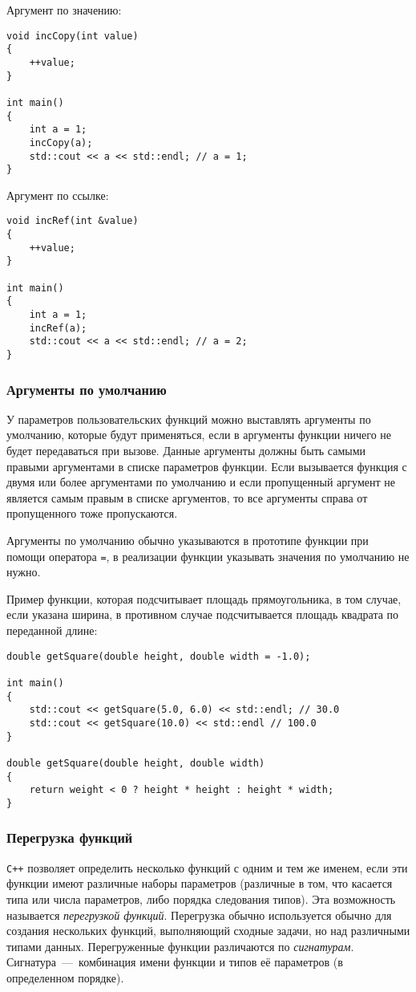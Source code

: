 Аргумент по значению:
\begin{lstlisting}
void incCopy(int value)
{
    ++value;
}

int main()
{
    int a = 1;
    incCopy(a);
    std::cout << a << std::endl; // a = 1;
}
\end{lstlisting}

Аргумент по ссылке:
\begin{lstlisting}
void incRef(int &value)
{
    ++value;
}

int main()
{
    int a = 1;
    incRef(a);
    std::cout << a << std::endl; // a = 2;
}
\end{lstlisting}

\subsubsection{Аргументы по умолчанию}
У параметров пользовательских функций можно выставлять аргументы по умолчанию, которые будут применяться, если в аргументы функции ничего не будет передаваться при вызове. Данные аргументы должны быть самыми правыми аргументами в списке параметров функции. Если вызывается функция с двумя или более аргументами по умолчанию и если пропущенный аргумент не является самым правым в списке аргументов, то все аргументы справа от пропущенного тоже пропускаются.

Аргументы по умолчанию обычно указываются в прототипе функции при помощи оператора \lstinline|=|, в реализации функции указывать значения по умолчанию не нужно.

Пример функции, которая подсчитывает площадь прямоугольника, в том случае, если указана ширина, в противном случае подсчитывается площадь квадрата по переданной длине:

\begin{lstlisting}
double getSquare(double height, double width = -1.0);

int main()
{
    std::cout << getSquare(5.0, 6.0) << std::endl; // 30.0
    std::cout << getSquare(10.0) << std::endl // 100.0
}

double getSquare(double height, double width)
{
    return weight < 0 ? height * height : height * width;
}
\end{lstlisting}

\subsubsection{Перегрузка функций}

\texttt{C++} позволяет определить несколько функций с одним и тем же именем, если эти функции имеют различные наборы параметров (различные в том, что касается типа или числа параметров, либо порядка следования типов). Эта возможность называется \emph{перегрузкой функций}. Перегрузка обычно используется обычно для создания  нескольких функций, выполняющий сходные задачи, но над различными типами данных. Перегруженные функции различаются по \emph{сигнатурам}. Сигнатура~---~комбинация имени функции и типов её параметров (в определенном порядке).

